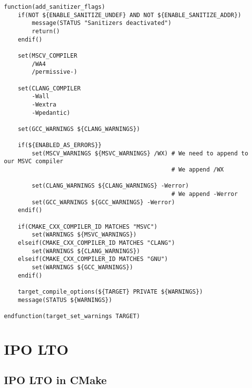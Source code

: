 \begin{verbatim}
function(add_sanitizer_flags)
    if(NOT ${ENABLE_SANITIZE_UNDEF} AND NOT ${ENABLE_SANITIZE_ADDR})
        message(STATUS "Sanitizers deactivated") 
        return()
    endif()

    set(MSCV_COMPILER
        /WA4
        /permissive-)

    set(CLANG_COMPILER
        -Wall
        -Wextra
        -Wpedantic)

    set(GCC_WARNINGS ${CLANG_WARNINGS})

    if(${ENABLED_AS_ERRORS}}
        set(MSCV_WARNINGS ${MSVC_WARNINGS} /WX) # We need to append to our MSVC compiler
                                                # We append /WX

        set(CLANG_WARNINGS ${CLANG_WARNINGS} -Werror)
                                                # We append -Werror
        set(GCC_WARNINGS ${GCC_WARNINGS} -Werror)
    endif()

    if(CMAKE_CXX_COMPILER_ID MATCHES "MSVC")
        set(WARNINGS ${MSVC_WARNINGS})
    elseif(CMAKE_CXX_COMPILER_ID MATCHES "CLANG")
        set(WARNINGS ${CLANG_WARNINGS})
    elseif(CMAKE_CXX_COMPILER_ID MATCHES "GNU")
        set(WARNINGS ${GCC_WARNINGS})
    endif()

    target_compile_options(${TARGET} PRIVATE ${WARNINGS})
    message(STATUS ${WARNINGS})

endfunction(target_set_warnings TARGET)
\end{verbatim}



\section{IPO LTO}


\subsection{IPO LTO in CMake}


















